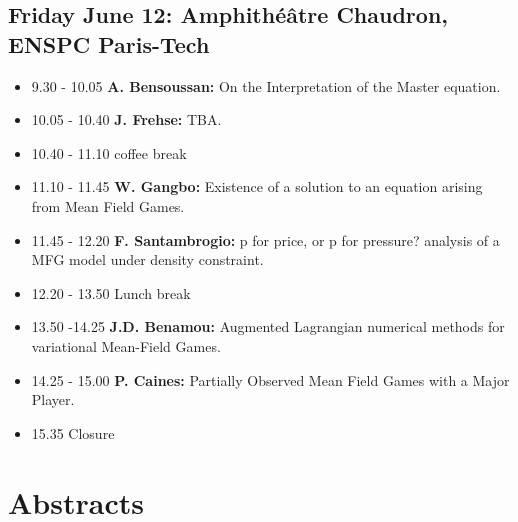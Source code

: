 \documentclass[11pt]{article}
\begin{document}
\subsection*{Friday June  12: Amphith{\'e}{\^a}tre Chaudron, ENSPC Paris-Tech}
\begin{itemize}
\item 9.30 - 10.05 {\bf  A. Bensoussan:} On the Interpretation of the Master equation.\item
10.05 - 10.40  {\bf J. Frehse:}  TBA. \item
10.40 - 11.10   coffee break \item
11.10 - 11.45 {\bf  W. Gangbo:}  Existence of a solution to an equation arising from Mean Field Games.\item
11.45 - 12.20 {\bf  F. Santambrogio:}  p for price, or p for pressure? analysis of a MFG model under density constraint.\item
12.20 - 13.50  Lunch break\item
13.50 -14.25  {\bf J.D. Benamou:} Augmented Lagrangian numerical methods for variational Mean-Field Games.\item
14.25 - 15.00 {\bf  P. Caines:} Partially Observed Mean Field Games with a Major Player.\item
15.35   Closure

\end{itemize}

\vfill
\eject

\section*{Abstracts}
\end{document}
